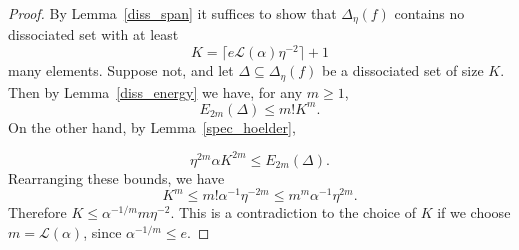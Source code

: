 \begin{proof}
By Lemma~\ref{diss_span} it suffices to show that $\Delta_\eta(f)$ contains no dissociated set with at least
\[K= \lceil e\mathcal{L}(\alpha)\eta^{-2}\rceil+1\]
many elements. Suppose not, and let $\Delta\subseteq \Delta_\eta(f)$ be a dissociated set of size $K$. Then by Lemma~\ref{diss_energy} we have, for any $m\geq 1$,
\[E_{2m}(\Delta)\leq m!K^m.\]
On the other hand, by Lemma~\ref{spec_hoelder},

\[\eta^{2m}\alpha K^{2m}\leq E_{2m}(\Delta).\]
Rearranging these bounds, we have
\[K^m \leq m! \alpha^{-1}\eta^{-2m}\leq m^m\alpha^{-1}\eta^{2m}.\]
Therefore $K\leq \alpha^{-1/m}m\eta^{-2}$. This is a contradiction to the choice of $K$ if we choose $m=\mathcal{L}(\alpha)$, since $\alpha^{-1/m}\leq e$.
\end{proof}
